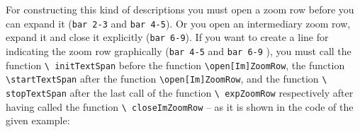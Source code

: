 \documentclass[
  DIV=calc,
  BCOR=5mm,
  12pt,
  headings=small,
  oneside,
  abstract=true,
  toc=bib,
  xcolor=dvipsnames,
  openany,
  ngerman,english]{scrartcl}
\begin{document}
\begin{center}
\end{center}

For constructing this kind of descriptions you must open a zoom row before you
can expand it (\texttt{bar 2-3} and \texttt{bar 4-5}). Or you open an
intermediary zoom row, expand it and close it explicitly (\texttt{bar 6-9}). If
you want to create a line for indicating the zoom row graphically (\texttt{bar
4-5} and \texttt{bar 6-9} ), you must call the function \texttt{\textbackslash
initTextSpan} before the function \texttt{\textbackslash open[Im]ZoomRow}, the
function \texttt{\textbackslash startTextSpan} after the function
\texttt{\textbackslash open[Im]ZoomRow}, and the function \texttt{\textbackslash
stopTextSpan} after the last call of the function \texttt{\textbackslash
expZoomRow} respectively after having called the function \texttt{\textbackslash
closeImZoomRow} -- as it is shown in the code of the given example:
\end{document}
